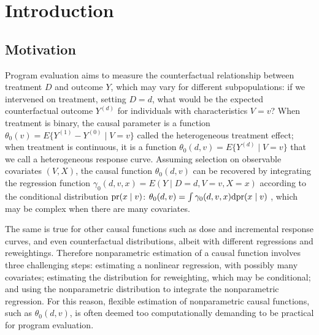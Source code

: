 \section{Introduction}\label{sec:intro}

\subsection{Motivation}

Program evaluation aims to measure the counterfactual relationship between treatment $D$ and outcome $Y$, which may vary for different subpopulations: if we intervened on treatment, setting $D=d$, what would be the expected counterfactual outcome $Y^{(d)}$ for individuals with characteristics $V=v$? When treatment is binary, the causal parameter is a function $\theta_0(v)=E\{Y^{(1)}-Y^{(0)} \mid V=v\}$ called the heterogeneous treatment effect; when treatment is continuous, it is a function $\theta_0(d,v)=E\{Y^{(d)} \mid V=v\}$ that we call a heterogeneous response curve. Assuming selection on observable covariates $(V,X)$, the causal function $\theta_0(d,v)$ can be recovered by integrating the regression function $\gamma_0(d,v,x)=E(Y \mid D=d,V=v,X=x)$ according to the conditional distribution $\text{\normalfont pr}(x \mid v)$: $\theta_0(d,v)=\int \gamma_0(d,v,x)\mathrm{d}\text{\normalfont pr}(x \mid v)$ \cite{rosenbaum1983central,robins1986new}, which may be complex when there are many covariates. 

The same is true for other causal functions such as dose
and incremental response curves, 
and even counterfactual distributions, albeit with different regressions and reweightings. Therefore nonparametric estimation of a causal function involves three challenging steps: estimating a nonlinear regression, with possibly many covariates; estimating the distribution for reweighting, which may be conditional; and using the nonparametric distribution to integrate the nonparametric regression. For this reason, flexible estimation of nonparametric causal functions, such as $\theta_0(d,v)$, is often deemed too computationally demanding to be practical for program evaluation. %



